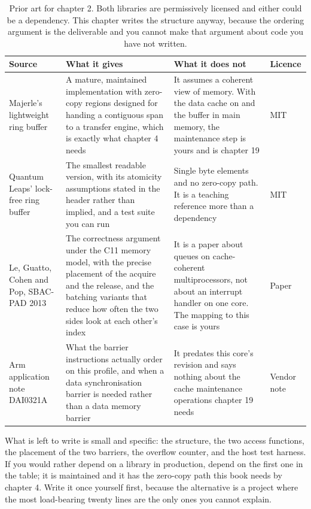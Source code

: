 \begin{table}[H]\centering\small
\begin{tabular}{p{34mm}p{46mm}p{38mm}p{20mm}}
\toprule
Source & What it gives & What it does not & Licence \\
\midrule
Majerle's lightweight ring buffer & A mature, maintained implementation with zero-copy regions designed for handing a contiguous span to a transfer engine, which is exactly what chapter 4 needs & It assumes a coherent view of memory. With the data cache on and the buffer in main memory, the maintenance step is yours and is chapter 19 & MIT \\
Quantum Leaps' lock-free ring buffer & The smallest readable version, with its atomicity assumptions stated in the header rather than implied, and a test suite you can run & Single byte elements and no zero-copy path. It is a teaching reference more than a dependency & MIT \\
Le, Guatto, Cohen and Pop, SBAC-PAD 2013 & The correctness argument under the C11 memory model, with the precise placement of the acquire and the release, and the batching variants that reduce how often the two sides look at each other's index & It is a paper about queues on cache-coherent multiprocessors, not about an interrupt handler on one core. The mapping to this case is yours & Paper \\
Arm application note DAI0321A & What the barrier instructions actually order on this profile, and when a data synchronisation barrier is needed rather than a data memory barrier & It predates this core's revision and says nothing about the cache maintenance operations chapter 19 needs & Vendor note \\
\bottomrule
\end{tabular}
\caption{Prior art for chapter 2. Both libraries are permissively licensed and either could be a dependency. This chapter writes the structure anyway, because the ordering argument is the deliverable and you cannot make that argument about code you have not written.}
\end{table}

What is left to write is small and specific: the structure, the two access
functions, the placement of the two barriers, the overflow counter, and the host
test harness. If you would rather depend on a library in production, depend on
the first one in the table; it is maintained and it has the zero-copy path this
book needs by chapter 4. Write it once yourself first, because the alternative
is a project where the most load-bearing twenty lines are the only ones you
cannot explain.

